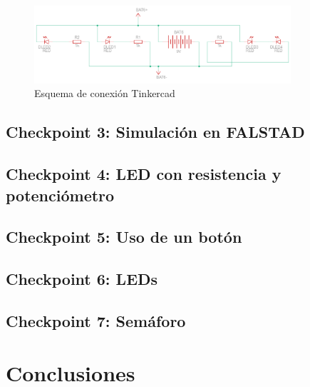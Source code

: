 \documentclass{article}
\begin{document}
\begin{figure}[H]
    \centering
    \includegraphics[width=0.85\textwidth]{./img/ckpt_2_3_2.png}
    \caption{Esquema de conexión Tinkercad}
    \label{fig:simulacion_esquema}
\end{figure}

\subsection{Checkpoint 3: Simulación en FALSTAD}

\subsection{Checkpoint 4: LED con resistencia y potenciómetro}

\subsection{Checkpoint 5: Uso de un botón}

\subsection{Checkpoint 6: LEDs}

\subsection{Checkpoint 7: Semáforo}

\section{Conclusiones}



\end{document}
